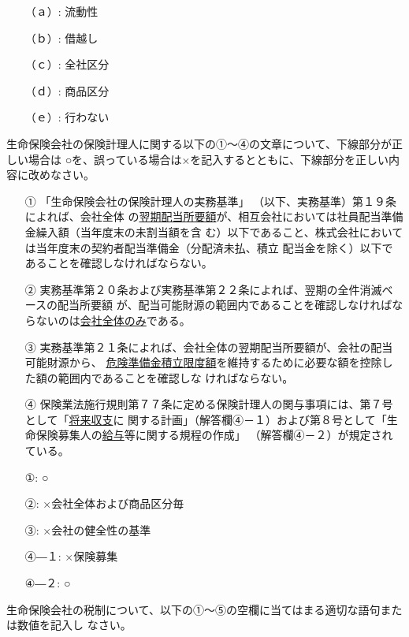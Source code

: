 \documentclass[report,gutter=10mm,fore-edge=10mm,uplatex,dvipdfmx]{jlreq}
\begin{document}
\answer{}
\begin{itemize}
\item[ （ａ）: ]  流動性
\item[ （ｂ）: ]  借越し
\item[ （ｃ）: ]  全社区分
\item[ （ｄ）: ]  商品区分
\item[ （ｅ）: ]  行わない
\end{itemize}


生命保険会社の保険計理人に関する以下の①～④の文章について、下線部分が正しい場合は
○を、誤っている場合は×を記入するとともに、下線部分を正しい内容に改めなさい。

\begin{itemize}
\item[①] 「生命保険会社の保険計理人の実務基準」
（以下、実務基準）第１９条によれば、会社全体
の\underline{翌期配当所要額}が、相互会社においては社員配当準備金繰入額（当年度末の未割当額を含
む）以下であること、株式会社においては当年度末の契約者配当準備金（分配済未払、積立
配当金を除く）以下であることを確認しなければならない。
\item[②] 実務基準第２０条および実務基準第２２条によれば、翌期の全件消滅ベースの配当所要額
が、配当可能財源の範囲内であることを確認しなければならないのは\underline{会社全体のみ}である。
\item[③] 実務基準第２１条によれば、会社全体の翌期配当所要額が、会社の配当可能財源から、
\underline{危険準備金積立限度額}を維持するために必要な額を控除した額の範囲内であることを確認しな
ければならない。
\item[④] 保険業法施行規則第７７条に定める保険計理人の関与事項には、第７号として「\underline{将来収支}に
関する計画」（解答欄④－１）および第８号として「生命保険募集人の\underline{給与}等に関する規程の作成」
（解答欄④－２）が規定されている。
\end{itemize}
 
\answer{}
\begin{itemize}
\item[ ①: ] ○
\item[ ②: ] ×会社全体および商品区分毎
\item[ ③: ] ×会社の健全性の基準
\item[ ④―１: ] ×保険募集
\item[ ④―２: ] ○
\end{itemize}


生命保険会社の税制について、以下の①～⑤の空欄に当てはまる適切な語句または数値を記入し
なさい。
\end{document}
